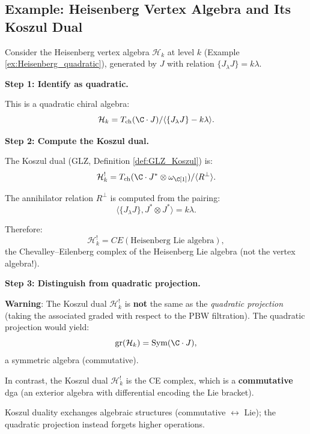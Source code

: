 \subsection{Example: Heisenberg Vertex Algebra and Its Koszul Dual}
\begin{example}
\label{ex:Heisenberg_Koszul}
Consider the Heisenberg vertex algebra $\mathcal{H}_k$ at level $k$ (Example \ref{ex:Heisenberg_quadratic}), generated by $J$ with relation $\{J_\lambda J\} = k\lambda$.

\textbf{Step 1: Identify as quadratic.}

This is a quadratic chiral algebra:
\begin{equation}
\mathcal{H}_k = T_{\text{ch}}(\C \cdot J) / \langle \{J_\lambda J\} - k\lambda \rangle.
\end{equation}

\textbf{Step 2: Compute the Koszul dual.}

The Koszul dual (GLZ, Definition \ref{def:GLZ_Koszul}) is:
\begin{equation}
\mathcal{H}_k^! = T_{\text{ch}}(\C \cdot J^* \otimes \omega_\C[1]) / \langle R^\perp \rangle.
\end{equation}

The annihilator relation $R^\perp$ is computed from the pairing:
\begin{equation}
\langle \{J_\lambda J\}, J^* \otimes J^* \rangle = k\lambda.
\end{equation}

Therefore:
\begin{equation}
\mathcal{H}_k^! = CE(\text{Heisenberg Lie algebra}),
\end{equation}
the Chevalley--Eilenberg complex of the Heisenberg Lie algebra (not the vertex algebra!).

\textbf{Step 3: Distinguish from quadratic projection.}

\textbf{Warning}: The Koszul dual $\mathcal{H}_k^!$ is \textbf{not} the same as the \emph{quadratic projection} (taking the associated graded with respect to the PBW filtration). The quadratic projection would yield:
\begin{equation}
\text{gr}(\mathcal{H}_k) = \text{Sym}(\C \cdot J),
\end{equation}
a symmetric algebra (commutative).

In contrast, the Koszul dual $\mathcal{H}_k^!$ is the CE complex, which is a \textbf{commutative} dga (an exterior algebra with differential encoding the Lie bracket).

Koszul duality exchanges algebraic structures (commutative $\leftrightarrow$ Lie); the quadratic projection instead forgets higher operations.
\end{example}

